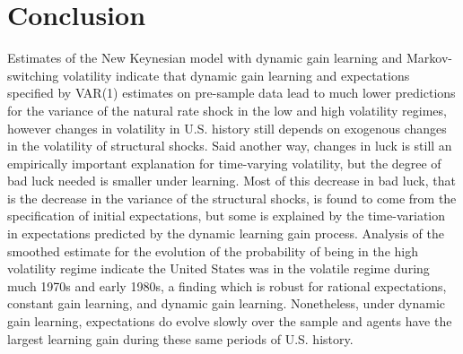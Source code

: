 \section{Conclusion}
Estimates of the New Keynesian model with dynamic gain learning and Markov-switching volatility indicate that dynamic gain learning and expectations specified by VAR(1) estimates on pre-sample data lead to much lower predictions for the variance of the natural rate shock in the low and high volatility regimes, however changes in volatility in U.S. history still depends on exogenous changes in the volatility of structural shocks.  Said another way, changes in luck is still an empirically important explanation for time-varying volatility, but the degree of bad luck needed is smaller under learning.  Most of this decrease in bad luck, that is the decrease in the variance of the structural shocks, is found to come from the specification of initial expectations, but some is explained by the time-variation in expectations predicted by the dynamic learning gain process.  Analysis of the smoothed estimate for the evolution of the probability of being in the high volatility regime indicate the United States was in the volatile regime during much 1970s and early 1980s, a finding which is robust for rational expectations, constant gain learning, and dynamic gain learning.  Nonetheless, under dynamic gain learning, expectations do evolve slowly over the sample and agents have the largest learning gain during these same periods of U.S. history.

